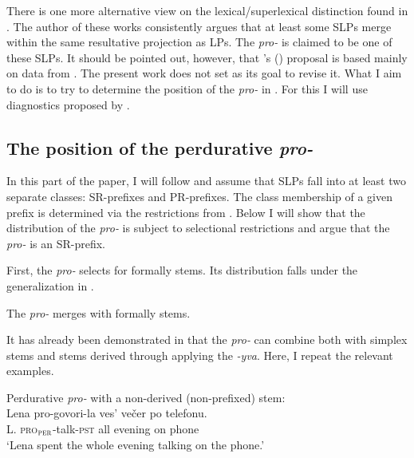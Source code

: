 \documentclass[output=paper,colorlinks,citecolor=brown,newtxmath]{langsci/langscibook}
\begin{document}
There is one more alternative view on the lexical/superlexical distinction found in  \citet{Žaucer2009vp,Žaucer2012syntax}. The author of these works consistently argues that at least some SLPs merge within the same resultative projection as LPs. The  \textit{pro-} is claimed to be one of these SLPs. It should be pointed out, however, that \citeauthor{Žaucer2009vp}'s (\citeyear{Žaucer2009vp,Žaucer2012syntax}) proposal is based mainly on data from . The present work does not set as its goal to revise it. What I aim to do is to try to determine the position of the  \textit{pro-} in . For this I will use diagnostics proposed by \citet{tatevosov2009mnozestvennaja, tatevosov2013mnozestvennaja}.

\subsection{The position of the perdurative \textit{pro-}} \label{2.2}
In this part of the paper, I will follow \cite{tatevosov2009mnozestvennaja,tatevosov2013mnozestvennaja} and assume that SLPs fall into at least two separate classes: SR-prefixes and PR-prefixes.
The class membership of a given prefix is determined via the restrictions from . Below I will show that the distribution of the  \textit{pro-} is subject to selectional restrictions and argue that the  \textit{pro-} is an SR-prefix.

First, the  \textit{pro-} selects for formally  stems. Its distribution falls under the generalization in .

\ea \label{ex:naumov:7}
The  \textit{pro-} merges with formally  stems.
\z

\noindent It has already been demonstrated in  that the  \textit{pro-} can combine both with simplex  stems and  stems derived through applying the  \textit{-yva}. Here, I repeat the relevant examples.

    \ea Perdurative \textit{pro-} with a non-derived (non-prefixed)  stem:\label{ex:naumov:8}\smallskip\\
    \gll Lena	pro-govori-la		ves’	večer		po	telefonu. \\
L. \textsc{pro}$_\textsc{per}$-talk-\textsc{pst}	all	evening	on	phone\\
\glt `Lena spent the whole evening talking on the phone.'
\z
\end{document}
